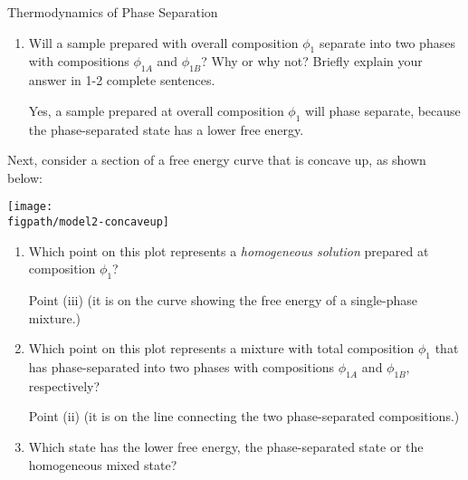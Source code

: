 \begin{activity}{Thermodynamics of Phase Separation}
\begin{ctqs}
\begin{enumerate}
				\item Will a sample prepared with overall composition $\phi_1$ separate into two phases with compositions $\phi_{1A}$ and $\phi_{1B}$?  Why or why not?  Briefly explain your answer in 1-2 complete sentences.
					
					\begin{solution}[1.5in]
					
						Yes, a sample prepared at overall composition $\phi_1$ will phase separate, because the phase-separated state has a lower free energy.
					
					\end{solution}
					
			\end{enumerate}
			
		\clearpage
		\question Next, consider a section of a free energy curve that is concave up, as shown below:
	
		\vspace{0.1in}
		\centerline{\texttt{[image: \\figpath/model2-concaveup]}}

			\begin{enumerate}
				\item Which point on this plot represents a \emph{homogeneous solution} prepared at composition $\phi_1$?
					
					\begin{solution}[0.75in]
					
						Point (iii) (it is on the curve showing the free energy of a single-phase mixture.)
						
					\end{solution}
					
				\item Which point on this plot represents a mixture with total composition $\phi_1$ that has phase-separated into two phases with compositions $\phi_{1A}$ and $\phi_{1B}$, respectively?
					
					\begin{solution}[0.75in]
					
						Point (ii) (it is on the line connecting the two phase-separated compositions.)
						
					\end{solution}
					
				\item Which state has the lower free energy, the phase-separated state or the homogeneous mixed state?
					
					\begin{solution}[0.75in]
					

\end{solution}
\end{enumerate}
\end{ctqs}
\end{activity}
